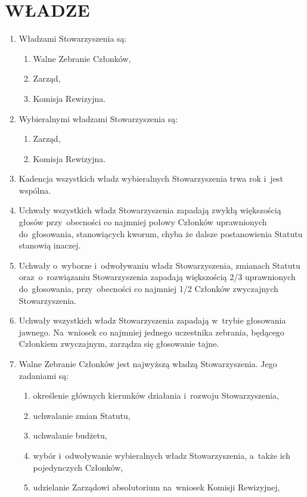 \documentclass{article}
\begin{document}
\section{WŁADZE}
  \begin{enumerate}
    \item Władzami Stowarzyszenia są:
      \begin{enumerate}
        \item Walne Zebranie Członków,
        \item Zarząd,
        \item Komisja Rewizyjna.
      \end{enumerate}
    \item Wybieralnymi władzami Stowarzyszenia są:
      \begin{enumerate}
        \item Zarząd,
        \item Komisja Rewizyjna.
      \end{enumerate}
    \item Kadencja wszystkich władz wybieralnych Stowarzyszenia trwa rok i~jest wspólna.
    \item Uchwały wszystkich władz Stowarzyszenia zapadają zwykłą większością głosów przy~obecności co najmniej połowy Członków uprawnionych do~głosowania, stanowiących kworum, chyba że dalsze postanowienia Statutu stanowią inaczej.
    \item Uchwały o~wyborze i~odwoływaniu władz Stowarzyszenia, zmianach Statutu oraz~o~rozwiązaniu Stowarzyszenia zapadają większością 2/3 uprawnionych do~głosowania, przy~obecności co najmniej 1/2 Członków zwyczajnych Stowarzyszenia.
    \item Uchwały wszystkich władz Stowarzyszenia zapadają w~trybie głosowania jawnego. Na~wniosek co najmniej jednego uczestnika zebrania, będącego Członkiem zwyczajnym, zarządza się głosowanie tajne.
    \item Walne Zebranie Członków jest najwyższą władzą Stowarzyszenia. Jego zadaniami są:
      \begin{enumerate}
        \item określenie głównych kierunków działania i~rozwoju Stowarzyszenia,
        \item uchwalanie zmian Statutu,
        \item uchwalanie budżetu,
        \item wybór i~odwoływanie wybieralnych władz Stowarzyszenia, a~także ich pojedynczych Członków,
        \item udzielanie Zarządowi absolutorium na~wniosek Komisji Rewizyjnej,

\end{enumerate}
\end{enumerate}
\end{document}
